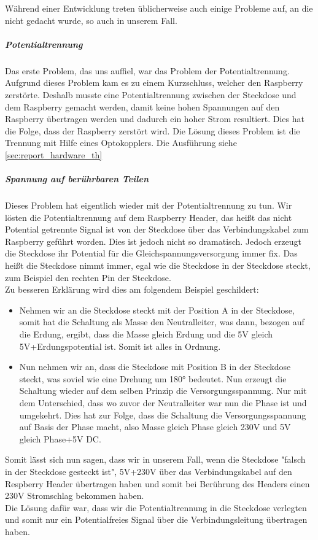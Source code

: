 Während einer Entwicklung treten üblicherweise auch einige Probleme auf, an die nicht gedacht wurde, so auch in unserem Fall.\\
\subparagraph{Potentialtrennung}\label{sec:report_hardware_pot}
Das erste Problem, das uns auffiel, war das Problem der Potentialtrennung. Aufgrund dieses Problem kam es zu einem Kurzschluss, welcher den Raspberry zerstörte. Deshalb musste eine Potentialtrennung zwischen der Steckdose und dem Raspberry gemacht werden, damit keine hohen Spannungen auf den Raspberry übertragen werden und dadurch ein hoher Strom resultiert. Dies hat die Folge, dass der Raspberry zerstört wird. Die Lösung dieses Problem ist die Trennung mit Hilfe eines Optokopplers. Die Ausführung siehe \autoref{sec:report_hardware_th} \\
\subparagraph{Spannung auf berührbaren Teilen}\label{sec:report_hardware_spannung}
Dieses Problem hat eigentlich wieder mit der Potentialtrennung zu tun. Wir lösten die Potentialtrennung auf dem Raspberry Header, das heißt das nicht Potential getrennte Signal ist von der Steckdose über das Verbindungskabel zum Raspberry geführt worden. Dies ist jedoch nicht so dramatisch. Jedoch erzeugt die Steckdose ihr Potential für die Gleichspannungsversorgung immer fix. Das heißt die Steckdose nimmt immer, egal wie die Steckdose in der Steckdose steckt, zum Beispiel den rechten Pin der Steckdose.\\
Zu besseren Erklärung wird dies am folgendem Beispiel geschildert:\\
\begin{itemize}
	\item Nehmen wir an die Steckdose steckt mit der Position A in der Steckdose, somit hat die Schaltung als Masse den Neutralleiter, was dann, bezogen auf die Erdung, ergibt, dass die Masse gleich Erdung und die  5V gleich 5V+Erdungspotential ist. Somit ist alles in Ordnung.
	\item Nun nehmen wir an, dass die Steckdose mit Position B in der Steckdose steckt, was soviel wie eine Drehung um 180° bedeutet. Nun erzeugt die Schaltung wieder auf dem selben Prinzip die Versorgungsspannung. Nur mit dem Unterschied, dass wo zuvor der Neutralleiter war nun die Phase ist und umgekehrt. Dies hat zur Folge, dass die Schaltung die Versorgungsspannung auf Basis der Phase macht, also Masse gleich Phase gleich 230V und 5V gleich Phase+5V DC.
\end{itemize}
Somit lässt sich nun sagen, dass wir in unserem Fall, wenn die Steckdose "falsch in der Steckdose gesteckt ist", 5V+230V über das Verbindungskabel auf den Respberry Header übertragen haben und somit bei Berührung des Headers einen 230V Stromschlag bekommen haben.\\
Die Lösung dafür war, dass wir die Potentialtrennung in die Steckdose verlegten und somit nur ein Potentialfreies Signal über die Verbindungsleitung übertragen haben.